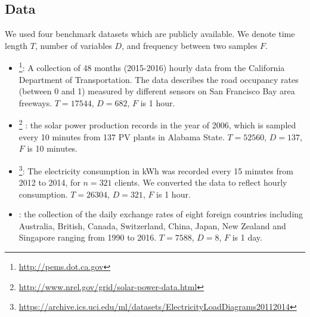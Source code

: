 \subsection{Data}
\label{sec:data}
We used four benchmark datasets which are publicly available. We denote time length $T$, number of variables $D$, and 
frequency between two samples $F$.
\begin{itemize}
    \item \traffic \footnote{\url{http://pems.dot.ca.gov}}: A collection of 48 months (2015-2016) hourly data from the California Department of Transportation. The data describes the road occupancy rates (between 0 and 1) measured by different sensors on San Francisco Bay area freeways. $T=17544$, $D=682$, $F$ is 1 hour. 
    \item \solar \footnote{\url{http://www.nrel.gov/grid/solar-power-data.html}} : the solar power production records in the year of 2006, which is sampled every 10 minutes from 137 PV plants in Alabama State. $T=52560$, $D=137$, $F$ is 10 minutes.
	\item \electricity \footnote{\url{https://archive.ics.uci.edu/ml/datasets/ElectricityLoadDiagrams20112014}}: The electricity consumption in kWh was recorded every 15 minutes from 2012 to 2014, for $n=321$ clients. We converted the data to reflect hourly consumption. $T=26304$, $D=321$, $F$ is 1 hour.
    \item \exchange: the collection of the daily exchange rates of eight foreign countries including Australia, British, Canada, Switzerland, China, Japan, New Zealand and Singapore ranging from 1990 to 2016. $T=7588$, $D=8$, $F$ is 1 day.
\end{itemize}

